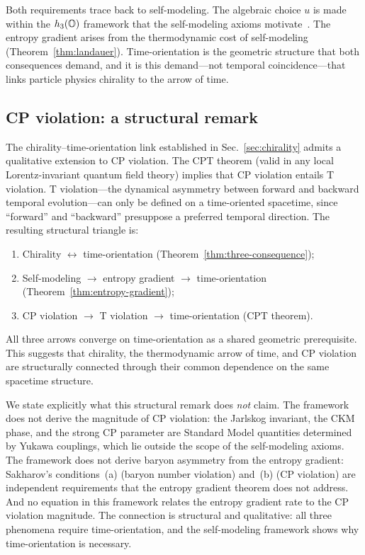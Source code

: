 Both requirements trace back to self-modeling.  The algebraic choice
$u$ is made within the $h_3(\mathbb{O})$ framework that the self-modeling
axioms motivate~\cite{Paper5,Paper7}.  The entropy gradient arises
from the thermodynamic cost of self-modeling
(Theorem~\ref{thm:landauer}).  Time-orientation is the geometric
structure that both consequences demand, and it is this demand---not
temporal coincidence---that links particle physics chirality to the
arrow of time.

\subsection{CP violation: a structural remark}
\label{sec:cp-discussion}

The chirality--time-orientation link established in
Sec.~\ref{sec:chirality} admits a qualitative extension to CP
violation.  The CPT theorem (valid in any local Lorentz-invariant
quantum field theory) implies that CP violation entails T violation.
T violation---the dynamical asymmetry between forward and backward
temporal evolution---can only be defined on a time-oriented spacetime,
since ``forward'' and ``backward'' presuppose a preferred temporal
direction.  The resulting structural triangle is:
\begin{enumerate}
  \item Chirality $\leftrightarrow$ time-orientation
    (Theorem~\ref{thm:three-consequence});
  \item Self-modeling $\to$ entropy gradient $\to$ time-orientation
    (Theorem~\ref{thm:entropy-gradient});
  \item CP violation $\to$ T violation $\to$ time-orientation
    (CPT theorem).
\end{enumerate}
All three arrows converge on time-orientation as a shared geometric
prerequisite.  This suggests that chirality, the thermodynamic arrow
of time, and CP violation are structurally connected through their
common dependence on the same spacetime structure.

We state explicitly what this structural remark does \emph{not} claim.
The framework does not derive the magnitude of CP violation: the
Jarlskog invariant, the CKM phase, and the strong CP parameter are
Standard Model quantities determined by Yukawa couplings, which lie
outside the scope of the self-modeling axioms.  The framework does not
derive baryon asymmetry from the entropy gradient: Sakharov's
conditions~(a) (baryon number violation) and~(b) (CP violation) are
independent requirements that the entropy gradient theorem does not
address.  And no equation in this framework relates the entropy
gradient rate to the CP violation magnitude.  The connection is
structural and qualitative: all three phenomena require
time-orientation, and the self-modeling framework shows why
time-orientation is necessary.

